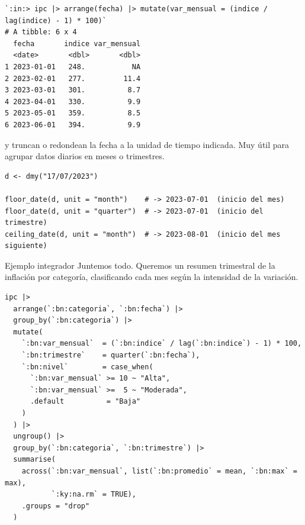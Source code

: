 \documentclass[8pt]{beamer}
\begin{document}
	\begin{frame}[fragile]
\begin{lstlisting}[style=RConsole]
`:in:> ipc |> arrange(fecha) |> mutate(var_mensual = (indice / lag(indice) - 1) * 100)`
# A tibble: 6 x 4
  fecha       indice var_mensual
  <date>       <dbl>       <dbl>
1 2023-01-01   248.           NA
2 2023-02-01   277.         11.4
3 2023-03-01   301.          8.7
4 2023-04-01   330.          9.9
5 2023-05-01   359.          8.5
6 2023-06-01   394.          9.9
\end{lstlisting}

		 y  truncan o redondean la fecha a la unidad de tiempo indicada. Muy útil para agrupar datos diarios en meses o trimestres.

\begin{lstlisting}[style=RScript]
d <- dmy("17/07/2023")

floor_date(d, unit = "month")    # -> 2023-07-01  (inicio del mes)
floor_date(d, unit = "quarter")  # -> 2023-07-01  (inicio del trimestre)
ceiling_date(d, unit = "month")  # -> 2023-08-01  (inicio del mes siguiente)
\end{lstlisting}
	\end{frame}


	\begin{frame}[fragile]{Ejemplo integrador}
		Juntemos todo. Queremos un resumen trimestral de la inflación por categoría, clasificando cada mes según la intensidad de la variación.

\begin{lstlisting}[style=RScript]
ipc |>
  arrange(`:bn:categoria`, `:bn:fecha`) |>
  group_by(`:bn:categoria`) |>
  mutate(
    `:bn:var_mensual`  = (`:bn:indice` / lag(`:bn:indice`) - 1) * 100,
    `:bn:trimestre`    = quarter(`:bn:fecha`),
    `:bn:nivel`        = case_when(
      `:bn:var_mensual` >= 10 ~ "Alta",
      `:bn:var_mensual` >=  5 ~ "Moderada",
      .default          = "Baja"
    )
  ) |>
  ungroup() |>
  group_by(`:bn:categoria`, `:bn:trimestre`) |>
  summarise(
    across(`:bn:var_mensual`, list(`:bn:promedio` = mean, `:bn:max` = max),
           `:ky:na.rm` = TRUE),
    .groups = "drop"
  )
\end{lstlisting}
	\end{frame}
\end{document}
